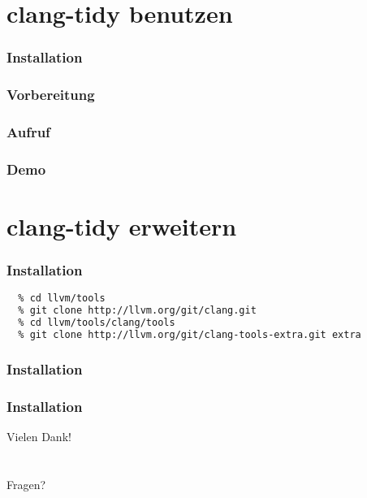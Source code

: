 \documentclass[aspectratio=169]{beamer}
\begin{document}
\section{clang-tidy benutzen}
\begin{frame}
  \frametitle{Installation}
\end{frame}
\begin{frame}
  \frametitle{Vorbereitung}
\end{frame}
\begin{frame}
  \frametitle{Aufruf}
\end{frame}
\begin{frame}
  \frametitle{Demo}
\end{frame}
\section{clang-tidy erweitern}
\begin{frame}
  \frametitle{Installation}
\end{frame}
\begin{lstlisting}[language=bash]
  % git clone http://llvm.org/git/llvm.git
  % cd llvm/tools
  % git clone http://llvm.org/git/clang.git
  % cd llvm/tools/clang/tools
  % git clone http://llvm.org/git/clang-tools-extra.git extra
 \end{lstlisting}
\begin{frame}
  \frametitle{Installation}
\end{frame}
\begin{frame}
  \frametitle{Installation}
\end{frame}
\begin{frame}
  \begin{center}
    \Huge{Vielen Dank!}\\
    ~\\
    ~\\
    \Large{Fragen?}
  \end{center}
\end{frame}
\end{document}
